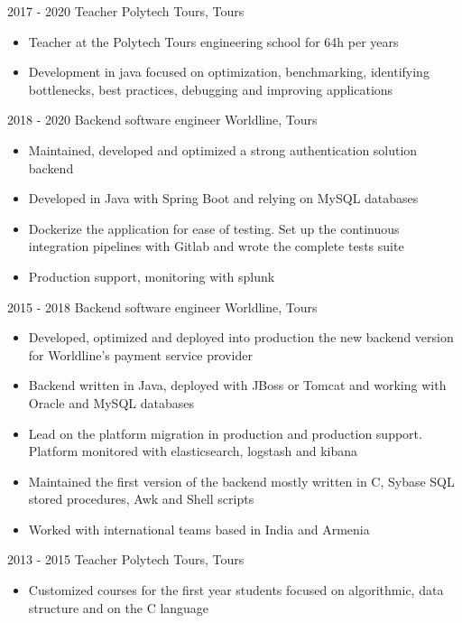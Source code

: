 \documentclass[]{friggeri-cv}
\begin{document}
\begin{entrylist}
	\vspace{4pt}
  \entry
    {2017 - 2020}
    {Teacher}
    {Polytech Tours, Tours}
    {
    \vspace{-0.8\baselineskip}
	\begin{itemize}[leftmargin=*]
		\item Teacher at the Polytech Tours engineering school for 64h per years
		\item Development in java focused on optimization, benchmarking, identifying bottlenecks, best practices, debugging and improving applications
	\end{itemize}
	}
	
	\vspace{4pt}
    \entry
    {2018 - 2020}
    {Backend software engineer}
    {Worldline, Tours}
    {
    \vspace{-0.8\baselineskip}
	\begin{itemize}[leftmargin=*]
		\item Maintained, developed and optimized a strong authentication solution backend
		\item Developed in Java with Spring Boot and relying on MySQL databases
		\item Dockerize the application for ease of testing. Set up the continuous integration pipelines with Gitlab and wrote  the complete tests suite
		\item Production support, monitoring with splunk
	\end{itemize}
	}
	\vspace{4pt}

      \entry
    {2015 - 2018}
    {Backend software engineer}
    {Worldline, Tours}
    {
    \vspace{-0.8\baselineskip}
    \begin{itemize}[leftmargin=*]
		\item Developed, optimized and deployed into production the new backend version for Worldline's payment service provider
		\item Backend written in Java, deployed with JBoss or Tomcat and working with Oracle and MySQL databases
		\item Lead on the platform migration in production and production support. Platform monitored with elasticsearch, logstash and kibana
		\item Maintained the first version of the backend mostly written in C, Sybase SQL stored procedures, Awk and Shell scripts
		\item Worked with international teams based in India and Armenia
	\end{itemize}
}

	\vspace{4pt}
    \entry
    {2013 - 2015}
    {Teacher}
    {Polytech Tours, Tours}
    {
    \vspace{-0.8\baselineskip}
	\begin{itemize}[leftmargin=*]
		\item Customized courses for the first year students focused on algorithmic, data structure and on the C language
	\end{itemize}
    }
\end{entrylist}
\end{document}
